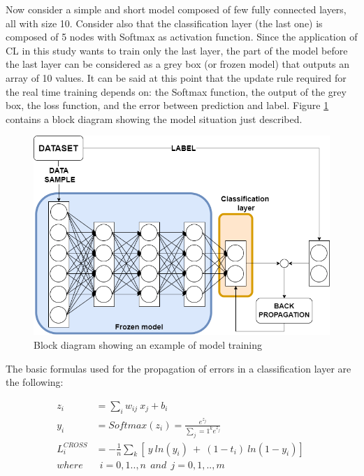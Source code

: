 \documentclass[12pt]{report}
\begin{document}
Now consider a simple and short model composed of few fully connected layers, all with size 10. Consider also that the classification layer (the last one) is composed of 5 nodes with Softmax as activation function. Since the application of CL in this study wants to train only the last layer, the part of the  model before the last layer can be considered as a grey box (or frozen model) that outputs an array of 10 values. It can be said at this point that the update rule required for the real time training depends on: the Softmax function, the output of the grey box, the loss function, and the error between prediction and label. Figure \ref{fig:block_diag_esempio} contains a block diagram showing the model situation just described. \\

\begin{figure}[h!]
    \centering
    \includegraphics[width=120mm]{Figures/Chapter3/basicsystem.png} 
    \caption{Block diagram showing an example of model training}
    \label{fig:block_diag_esempio}    
\end{figure}

The basic formulas used for the propagation of errors in a classification layer are the following:

\begin{align} 
	z_i &= \sum_i w_{ij} \: x_j + b_i \label{zi} \\ 
	y_i &= Softmax(z_i) = \frac{e^{z_j}}{\sum_j=1^k e^{z_j}} 	\label{yi} \\
	L^{CROSS}_i &= - \frac{1}{n} \sum_k [\ y \: ln(y_i) \: +\: (1-t_i) \: ln(1-y_i) ]\ \label{cost_cross} \\
	where & \: \: i= 0,1..,n  \: \: and \: \:  j=0,1,..,m \nonumber 
\end{align}
\end{document}
